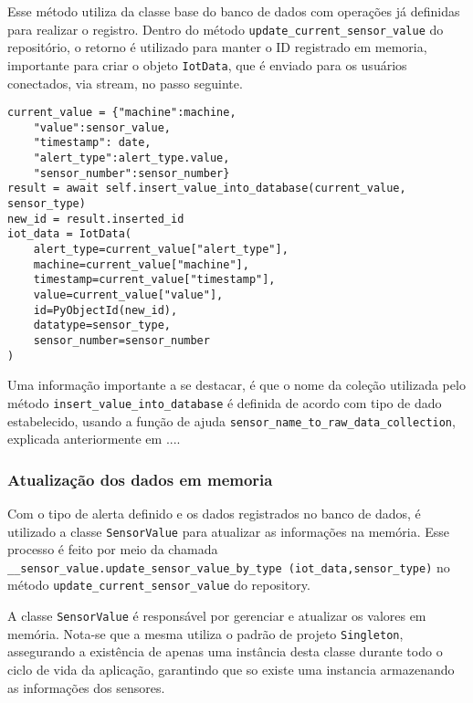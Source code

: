 Esse método utiliza da classe base do banco de dados com operações já definidas para realizar o registro. Dentro do método \texttt{update\_current\_sensor\_value} do repositório, o retorno é utilizado para manter o ID registrado em memoria, importante para criar o objeto \texttt{IotData}, que é enviado para os usuários conectados, via stream, no passo seguinte.

\begin{verbatim}
current_value = {"machine":machine,
    "value":sensor_value,
    "timestamp": date,
    "alert_type":alert_type.value,
    "sensor_number":sensor_number}
result = await self.insert_value_into_database(current_value, sensor_type)
new_id = result.inserted_id
iot_data = IotData(
    alert_type=current_value["alert_type"],
    machine=current_value["machine"],
    timestamp=current_value["timestamp"],
    value=current_value["value"],
    id=PyObjectId(new_id),
    datatype=sensor_type,
    sensor_number=sensor_number
)
\end{verbatim}

Uma informação importante a se destacar, é que o nome da coleção utilizada pelo método \texttt{insert\_value\_into\_database} é definida de acordo com tipo de dado estabelecido, usando a função de ajuda \texttt{sensor\_name\_to\_raw\_data\_collection}, explicada anteriormente em ....

\subsubsection{Atualização dos dados em memoria}

Com o tipo de alerta definido e os dados registrados no banco de dados, é utilizado a classe \texttt{SensorValue} para atualizar as informações na memória. Esse processo é feito por meio da chamada \texttt{\_\_sensor\_value.update\_sensor\_value\_by\_type (iot\_data,sensor\_type)} no método \texttt{update\_current\_sensor\_value} do repository.


A classe \texttt{SensorValue} é responsável por gerenciar e atualizar os valores em memória. Nota-se que a mesma utiliza o padrão de projeto \texttt{Singleton}, assegurando a existência de apenas uma instância desta classe durante todo o ciclo de vida da aplicação, garantindo que so existe uma instancia armazenando as informações dos sensores.

